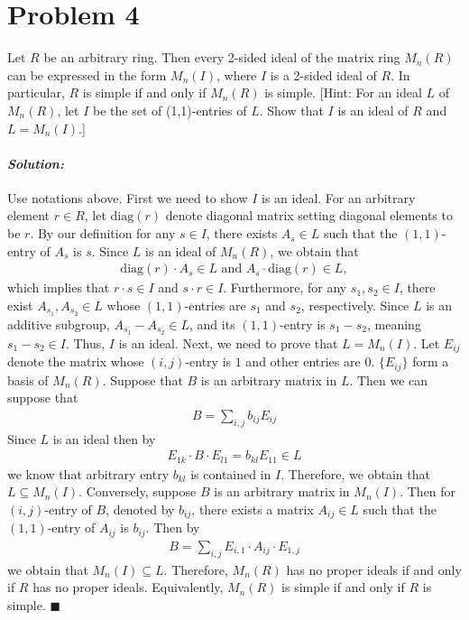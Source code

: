 \documentclass[12pt, a4paper]{article}
\theoremstyle{remark}
\newenvironment{solution}
  {\paragraph{\textit{Solution:}}\par\medskip}
  {\hfill$\blacksquare$\vspace{0.1cm}}
\begin{document}
\section*{Problem 4}
Let $R$ be an arbitrary ring. Then every 2-sided ideal of the matrix ring $M_n(R)$ can be expressed in the form $M_n(I)$, where $I$ is a 2-sided ideal of $R$. In particular, $R$ is simple if and only if $M_n(R)$ is simple. [Hint: For an ideal $L$ of $M_n(R)$, let $I$ be the set of (1,1)-entries of $L$. Show that $I$ is an ideal of $R$ and $L = M_n(I)$.]

\begin{solution}
    Use notations above.
    First we need to show $I$ is an ideal. 
    For an arbitrary element $r\in R$, let $\text{diag}(r)$ denote diagonal matrix setting diagonal elements to be $r$.
    By our definition for any $s\in I$, there exists $A_s\in L$ such that the $(1,1)$-entry of $A_s$ is $s$.
    Since $L$ is an ideal of $M_n(R)$,
    we obtain that 
    \begin{align*}
        \text{diag}(r)\cdot  A_s\in L\text{ and }A_s\cdot\text{diag}(r)  \in L,
    \end{align*} 
    which implies that $r\cdot s\in I$ and $s\cdot r\in I$.
    Furthermore, for any $s_1, s_2 \in I$, there exist $A_{s_1}, A_{s_2} \in L$ whose $(1,1)$-entries are $s_1$ and $s_2$, respectively. Since $L$ is an additive subgroup, $A_{s_1} - A_{s_2} \in L$, and its $(1,1)$-entry is $s_1 - s_2$, meaning $s_1 - s_2 \in I$.
    Thus, $I$ is an ideal. 
    Next, we need to prove that $L=M_n(I)$. Let $E_{ij}$ denote the matrix whose $(i,j)$-entry is $1$ and other entries are $0$. $\{E_{ij}\}$ form a basis of $M_n(R)$. 
    Suppose that $B$ is an arbitrary matrix in $L$. Then we can suppose that 
    \begin{align*}
        B = \sum_{i,j} b_{ij} E_{ij}
    \end{align*}
    Since $L$ is an ideal then by 
    \begin{align*}
        E_{1k}\cdot B\cdot E_{l1} = b_{kl}E_{11}\in L
    \end{align*}
    we know that arbitrary entry $b_{kl}$ is contained in $I$. Therefore, we obtain that $L\subseteq M_n(I)$.
    Conversely, suppose $B$ is an arbitrary matrix in $M_n(I)$. Then for $(i,j)$-entry of $B$, denoted by $b_{ij}$, there exists a matrix $A_{ij}\in L$ such
    that the $(1,1)$-entry of $A_{ij}$ is $b_{ij}$. Then by 
    \begin{align*}
        B = \sum_{i,j} E_{i,1}\cdot A_{ij}\cdot E_{1,j}
    \end{align*}
    we obtain that $M_n(I)\subseteq L$. 
    Therefore, $M_n(R)$ has no proper ideals if and only if $R$ has no proper ideals. Equivalently, $M_n(R)$ is simple if and only if $R$ is simple.
\end{solution}
\end{document}
